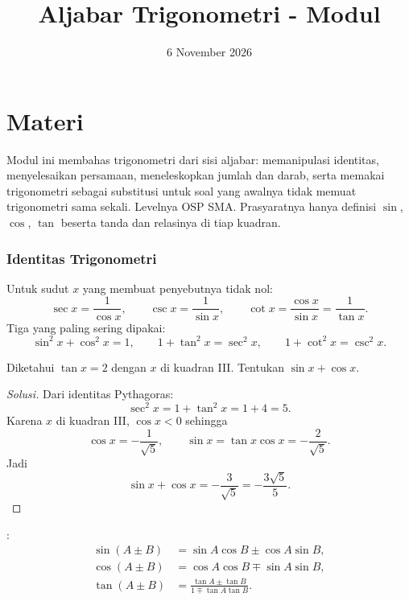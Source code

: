 \documentclass[12pt]{scrartcl}
\title{Aljabar Trigonometri - Modul}
\date{6 November 2026}
\begin{document}
\maketitle

\renewcommand*\contentsname{Daftar Isi}
\tableofcontents

\newpage

\part*{Materi}

Modul ini membahas trigonometri dari sisi aljabar: memanipulasi identitas,
menyelesaikan persamaan, meneleskopkan jumlah dan darab, serta memakai
trigonometri sebagai substitusi untuk soal yang awalnya tidak memuat
trigonometri sama sekali. Levelnya OSP SMA. Prasyaratnya hanya definisi
$\sin$, $\cos$, $\tan$ beserta tanda dan relasinya di tiap kuadran.

\section{Identitas Trigonometri}

\begin{definition}
Untuk sudut $x$ yang membuat penyebutnya tidak nol:
\[ \sec x = \frac{1}{\cos x}, \qquad \csc x = \frac{1}{\sin x},
\qquad \cot x = \frac{\cos x}{\sin x} = \frac{1}{\tan x}. \]
Tiga  yang paling sering dipakai:
\[ \sin^2 x + \cos^2 x = 1, \qquad 1 + \tan^2 x = \sec^2 x,
\qquad 1 + \cot^2 x = \csc^2 x. \]
\end{definition}

\begin{example}
Diketahui $\tan x = 2$ dengan $x$ di kuadran III. Tentukan $\sin x + \cos x$.
\end{example}
\begin{proof}[Solusi]
Dari identitas Pythagoras:
\[ \sec^2 x = 1 + \tan^2 x = 1 + 4 = 5. \]
Karena $x$ di kuadran III, $\cos x < 0$ sehingga
\[ \cos x = -\frac{1}{\sqrt{5}}, \qquad
\sin x = \tan x \cos x = -\frac{2}{\sqrt{5}}. \]
Jadi
\[ \sin x + \cos x = -\frac{3}{\sqrt{5}} = -\frac{3\sqrt{5}}{5}. \]
\end{proof}

\begin{theorem}
:
\begin{align*}
\sin(A \pm B) &= \sin A \cos B \pm \cos A \sin B, \\
\cos(A \pm B) &= \cos A \cos B \mp \sin A \sin B, \\
\tan(A \pm B) &= \frac{\tan A \pm \tan B}{1 \mp \tan A \tan B}.
\end{align*}
\end{theorem}
\end{document}
